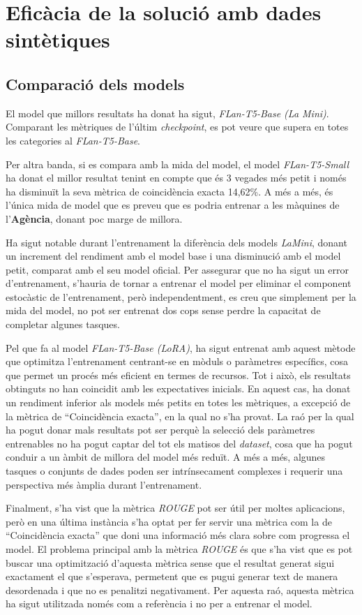 \section{Eficàcia de la solució amb dades sintètiques}

\subsection{Comparació dels models}
El model que millors resultats ha donat ha sigut, \textit{FLan-T5-Base (La Mini)}. Comparant les mètriques de l'últim \textit{checkpoint}, es pot veure que supera en totes les categories al \textit{FLan-T5-Base}. 

Per altra banda, si es compara amb la mida del model, el model \textit{FLan-T5-Small} ha donat el millor resultat tenint en compte que és 3 vegades més petit i només ha disminuït la seva mètrica de coincidència exacta 14,62\%. A més a més, és l'única mida de model que es preveu que es podria entrenar a les màquines de l'\textbf{Agència}, donant poc marge de millora.

Ha sigut notable durant l'entrenament la diferència dels models \textit{LaMini}, donant un increment del rendiment amb el model base i una disminució amb el model petit, comparat amb el seu model oficial. Per assegurar que no ha sigut un error d'entrenament, s'hauria de tornar a entrenar el model per eliminar el component estocàstic de l'entrenament, però independentment, es creu que simplement per la mida del model, no pot ser entrenat dos cops sense perdre la capacitat de completar algunes tasques.

Pel que fa al model \textit{FLan-T5-Base (LoRA)}, ha sigut entrenat amb aquest mètode que optimitza l'entrenament centrant-se en mòduls o paràmetres específics, cosa que permet un procés més eficient en termes de recursos. Tot i això, els resultats obtinguts no han coincidit amb les expectatives inicials. En aquest cas, ha donat un rendiment inferior als models més petits en totes les mètriques, a excepció de la mètrica de ``Coincidència exacta'', en la qual no s'ha provat. La raó per la qual ha pogut donar mals resultats pot ser perquè la selecció dels paràmetres entrenables no ha pogut captar del tot els matisos del \textit{dataset}, cosa que ha pogut conduir a un àmbit de millora del model més reduït. A més a més, algunes tasques o conjunts de dades poden ser intrínsecament complexes i requerir una perspectiva més àmplia durant l'entrenament. 

Finalment, s'ha vist que la mètrica \textit{ROUGE} pot ser útil per moltes aplicacions, però en una última instància s'ha optat per fer servir una mètrica com la de ``Coincidència exacta'' que doni una informació més clara sobre com progressa el model. El problema principal amb la mètrica \textit{ROUGE} és que s'ha vist que es pot buscar una optimització d'aquesta mètrica sense que el resultat generat sigui exactament el que s'esperava, permetent que es pugui generar text de manera desordenada i que no es penalitzi negativament. Per aquesta raó, aquesta mètrica ha sigut utilitzada només com a referència i no per a entrenar el model.





